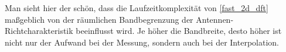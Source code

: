 Man sieht hier der sch\"on, dass die Laufzeitkomplexit\"at von \eqref{fast_2d_dft} ma{\ss}geblich von der r\"aumlichen Bandbegrenzung der Antennen-Richtcharakteristik beeinflusst wird. Je h\"oher die Bandbreite, desto h\"oher ist nicht nur der Aufwand bei der Messung, sondern auch bei der Interpolation.